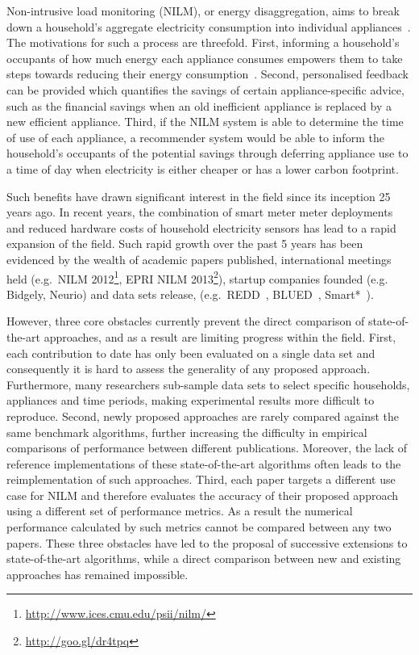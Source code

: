 \documentclass{sig-alternate}
\begin{document}
\noindent
Non-intrusive load monitoring (NILM), or energy disaggregation, aims to break down a household's aggregate electricity consumption into individual appliances~\cite{hart_1992}. The motivations for such a process are threefold. First, informing a household's occupants of how much energy each appliance consumes empowers them to take steps towards reducing their energy consumption~\cite{darby_2006}. Second, personalised feedback can be provided which quantifies the savings of certain appliance-specific advice, such as the financial savings when an old inefficient appliance is replaced by a new efficient appliance. Third, if the NILM system is able to determine the time of use of each appliance, a recommender system would be able to inform the household's occupants of the potential savings through deferring appliance use to a time of day when electricity is either cheaper or has a lower carbon footprint. %

Such benefits have drawn significant interest in the field since its inception 25 years ago. In recent years, the combination of smart meter meter deployments~\cite{CaliforniaPublicUtilitiesCommission2006,DepartmentofEnergy&ClimateChange2013} and reduced hardware costs of household electricity sensors has lead to a rapid expansion of the field. Such rapid growth over the past 5 years has been evidenced by the wealth of academic papers published, international meetings held (e.g.\ NILM 2012\footnote{\url{http://www.ices.cmu.edu/psii/nilm/}}, EPRI NILM 2013\footnote{\url{http://goo.gl/dr4tpq}}), startup companies founded (e.g. Bidgely, Neurio) and data sets release, (e.g.\ REDD~\cite{redd}, BLUED~\cite{blued}, Smart*~\cite{smart}).

However, three core obstacles currently prevent the direct comparison of state-of-the-art approaches, and as a result are limiting progress within the field. First, each contribution to date has only been evaluated on a single data set and consequently it is hard to assess the generality of any proposed approach. Furthermore, many researchers sub-sample data sets to select specific households, appliances and time periods, making experimental results more difficult to reproduce. Second, newly proposed approaches are rarely compared against the same benchmark algorithms, further increasing the difficulty in empirical comparisons of performance between different publications. Moreover, the lack of reference implementations of these state-of-the-art algorithms often leads to the reimplementation of such approaches. Third, each paper targets a different use case for NILM and therefore evaluates the accuracy of their proposed approach using a different set of performance metrics. As a result the numerical performance calculated by such metrics cannot be compared between any two papers. These three obstacles have led to the proposal of successive extensions to state-of-the-art algorithms, while a direct comparison between new and existing approaches has remained impossible.
\end{document}

